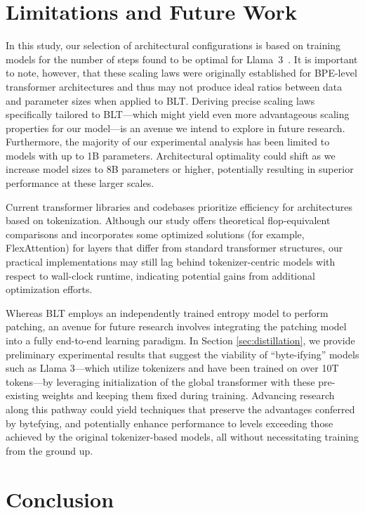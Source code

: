 \section{Limitations and Future Work}

In this study, our selection of architectural configurations is based on training models for the number of steps found to be optimal for Llama~3~\citep{dubey2024llama}. It is important to note, however, that these scaling laws were originally established for BPE-level transformer architectures and thus may not produce ideal ratios between data and parameter sizes when applied to {\textsc BLT}. Deriving precise scaling laws specifically tailored to {\textsc BLT}—which might yield even more advantageous scaling properties for our model—is an avenue we intend to explore in future research. Furthermore, the majority of our experimental analysis has been limited to models with up to 1B parameters. Architectural optimality could shift as we increase model sizes to 8B parameters or higher, potentially resulting in superior performance at these larger scales.

Current transformer libraries and codebases prioritize efficiency for architectures based on tokenization. Although our study offers theoretical flop-equivalent comparisons and incorporates some optimized solutions (for example, FlexAttention) for layers that differ from standard transformer structures, our practical implementations may still lag behind tokenizer-centric models with respect to wall-clock runtime, indicating potential gains from additional optimization efforts.

Whereas {\textsc BLT} employs an independently trained entropy model to perform patching, an avenue for future research involves integrating the patching model into a fully end-to-end learning paradigm. In Section \ref{sec:distillation}, we provide preliminary experimental results that suggest the viability of “byte-ifying” models such as Llama 3—which utilize tokenizers and have been trained on over 10T tokens—by leveraging initialization of the global transformer with these pre-existing weights and keeping them fixed during training. Advancing research along this pathway could yield techniques that preserve the advantages conferred by bytefying, and potentially enhance performance to levels exceeding those achieved by the original tokenizer-based models, all without necessitating training from the ground up.

\section{Conclusion}
\label{section:conclusion}

